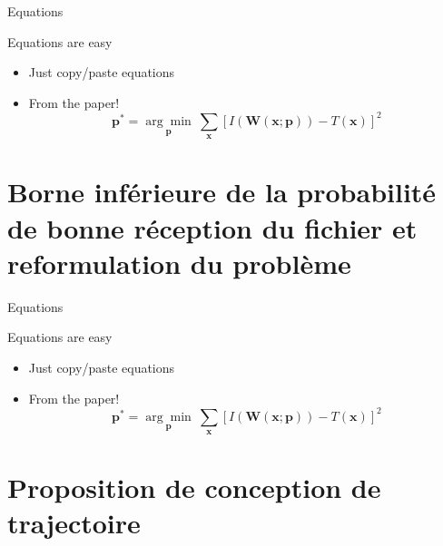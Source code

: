 \documentclass[utf8, a4paper]{beamer}
\begin{document}
\begin{frame}
{Equations}

Equations are easy
\begin{itemize}
	\item Just copy/paste equations\pause
	\item From the paper!
	\begin{equation*}
	\textbf{p}^* = \underset{\textbf{p}}{\arg\!\min}~\sum_{\textbf{x}}\left[ I(\textbf{W}(\textbf{x};\textbf{p})) - T(\textbf{x}) \right]^2
	\end{equation*}
\end{itemize}
\end{frame}

\section{Borne inférieure de la probabilité de bonne réception du fichier et reformulation du problème}



\begin{frame}{Equations}

  Equations are easy
  \begin{itemize}
  \item Just copy/paste equations\pause
  \item From the paper!
    \begin{equation*}
      \textbf{p}^* = \underset{\textbf{p}}{\arg\!\min}~\sum_{\textbf{x}}\left[ I(\textbf{W}(\textbf{x};\textbf{p})) - T(\textbf{x}) \right]^2
    \end{equation*}
  \end{itemize}
\end{frame}

\section{Proposition de conception de trajectoire}
\end{document}
